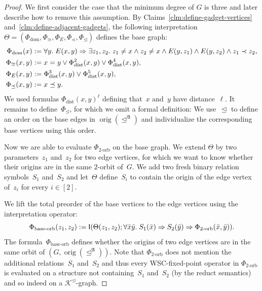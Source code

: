 \documentclass[]{lmcs}
\newcommand{\qspace}{\mathchoice{\;}{\,}{}{}}
\newcommand{\formA}{\Phi}
\newcommand{\interpret}{\Theta}
\newcommand{\tup}[1]{\bar{#1}}
\newcommand{\Struct}{\mathfrak{A}}
\newcommand{\spleq}{\preceq}
\newcommand{\spless}{\prec}
\newcommand{\GraphClass}{\mathcal{K}}
\newcommand{\iop}[2]{\mathsf{I}(#1;#2)}
\newcommand{\orig}[1]{\operatorname{orig}(#1)}
\newcommand{\indRel}{\trianglelefteq}
\newcommand{\indClosure}[1]{#1^\indRel}
\begin{document}
\begin{proof}
	
	\noindent
	
	We first consider the case that the minimum degree of $G$ is three and later describe how to remove this assumption.
	By Claims~\ref{clm:define-gadget-vertices} and~\ref{clm:define-adjacent-gadgets}, 
	the following interpretation
	$\interpret = (\formA_{\text{dom}}, \formA_{\cong}, \formA_{E}, \formA_{\spleq}, \formA_\indRel)$ defines the base graph:
	\begin{align*}
		\formA_{\text{dom}}(x) &:= \forall y.\qspace E(x,y) \Rightarrow \exists z_1,z_2.\qspace z_1\neq x\land z_2 \neq x \land E(y,z_1)\land E(y,z_2)\land   z_1 \spless z_2,\\
		\formA_{\cong}(x,y) &:= x=y \lor \formA_{\text{dist}}^2 (x,y) \lor \formA_{\text{dist}}^4 (x,y),\\
		\formA_{E} (x,y)&:=  \formA_{\text{dist}}^3 (x,y) \lor \formA_{\text{dist}}^5 (x,y), \\
		\formA_{\spleq}(x,y) &:= x \spleq y.
	\end{align*}
	We used formulas $\formA_{\text{dist}}(x,y)^\ell$ defining that~$x$ and~$y$ have distance~$\ell$.
	It remains to define~$\formA_\indRel$,
	for which we omit a formal definition:
	We use~$\indRel$ to define an order on the base edges in $\orig{\indRel^\Struct}$ and individualize the corresponding base vertices using this order. 
	
	Now we are able to evaluate $\formA_{2\text{-orb}}$ on the base graph. 
	We extend $\interpret$ by two parameters~$z_1$ and~$z_2$
	for two edge vertices, for which we want to know whether their origins are in the same $2$-orbit of~$G$.
	We add two fresh binary relation symbols~$S_1$ and~$S_2$
	and let~$\interpret$ define~$S_i$ to contain the origin of the edge vertex of~$z_i$ for every $i \in [2]$.

	We lift the total preorder of the base vertices
	to the edge vertices using the interpretation operator:
	\[\formA_{\text{base-orb}}(z_1,z_2) := \iop{\interpret(z_1,z_2)}{
	\forall \tup{x}\tup{y}.\qspace S_1(\tup{x}) \Rightarrow S_2(\tup{y}) \Rightarrow \formA_{2\text{-orb}}(\tup{x},\tup{y})}.\]
	The formula~$\formA_{\text{base-orb}}$ defines whether the
	origins of two edge vertices are in the same orbit of $(G,\orig{\indRel^\Struct})$.
	Note that $\formA_{2\text{-orb}}$ does not mention the additional relations~$S_1$ and~$S_2$
	and thus every WSC-fixed-point operator in $\formA_{2\text{-orb}}$
	is evaluated on a structure not containing~$S_1$ and~$S_2$
	(by the reduct semantics) and so indeed on a $\indClosure{\GraphClass}$-graph.
	

\end{proof}
\end{document}
